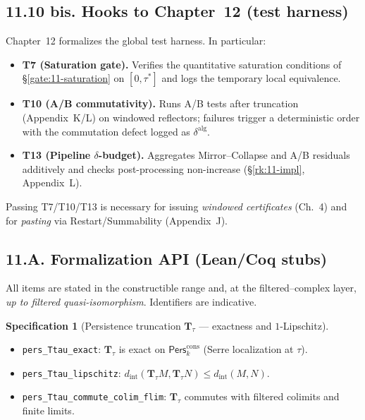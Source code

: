 \documentclass[11pt]{article}
\numberwithin{equation}{section}
\theoremstyle{plain}
\theoremstyle{definition}
\theoremstyle{remark}
\newcommand{\Pers}{\mathsf{Pers}}
\theoremstyle{plain}
\theoremstyle{definition}
\numberwithin{equation}{section}
\theoremstyle{definition}
\newtheorem{specification}[theorem]{Specification}
\numberwithin{equation}{section}
\theoremstyle{plain}
\theoremstyle{definition}
\theoremstyle{remark}
\begin{document}
\subsection*{11.10 bis. Hooks to Chapter~12 (test harness)}
Chapter~12 formalizes the global test harness. In particular:
\begin{itemize}
  \item \textbf{T7 (Saturation gate).} Verifies the quantitative saturation conditions of \S\ref{gate:11-saturation} on $[0,\tau^\ast]$ and logs the temporary local equivalence.
  \item \textbf{T10 (A/B commutativity).} Runs A/B tests after truncation (Appendix~K/L) on windowed reflectors; failures trigger a deterministic order with the commutation defect logged as $\delta^{\mathrm{alg}}$.
  \item \textbf{T13 (Pipeline $\delta$-budget).} Aggregates Mirror–Collapse and A/B residuals additively and checks post-processing non-increase (\S\ref{rk:11-impl}, Appendix~L).
\end{itemize}
Passing T7/T10/T13 is necessary for issuing \emph{windowed certificates} (Ch.~4) and for \emph{pasting} via Restart/Summability (Appendix~J).

\subsection*{11.A. Formalization API (Lean/Coq stubs)}
All items are stated in the constructible range and, at the filtered–complex layer, \emph{up to filtered quasi-isomorphism}. Identifiers are indicative.

\begin{specification}[Persistence truncation $\mathbf{T}_\tau$ — exactness and $1$-Lipschitz]
\begin{itemize}
  \item \texttt{pers\_Ttau\_exact}: $\mathbf{T}_\tau$ is exact on $\Pers^{\mathrm{cons}}_k$ (Serre localization at $\tau$).
  \item \texttt{pers\_Ttau\_lipschitz}: $d_{\mathrm{int}}(\mathbf{T}_\tau M,\mathbf{T}_\tau N)\le d_{\mathrm{int}}(M,N)$.
  \item \texttt{pers\_Ttau\_commute\_colim\_flim}: $\mathbf{T}_\tau$ commutes with filtered colimits and finite limits.
\end{itemize}
\end{specification}
\end{document}
